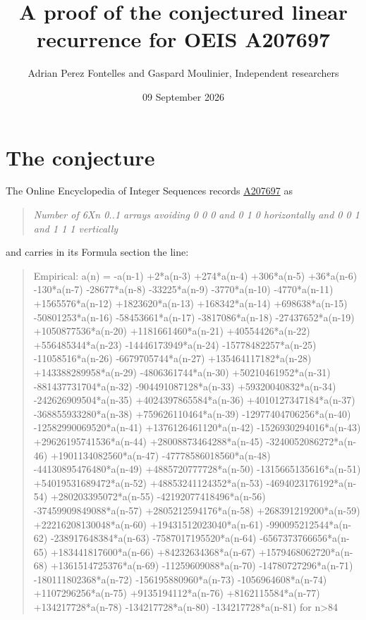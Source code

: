 \documentclass[11pt]{article}
\title{A proof of the conjectured linear recurrence for OEIS A207697}
\author{Adrian Perez Fontelles and Gaspard Moulinier, Independent researchers}
\date{09 September 2026}
\theoremstyle{definition}
\begin{document}
\maketitle
\section{The conjecture}

The Online Encyclopedia of Integer Sequences records \href{https://oeis.org/A207697}{A207697} as

\begin{quote}\itshape Number of 6Xn 0..1 arrays avoiding 0 0 0 and 0 1 0 horizontally and 0 0 1 and 1 1 1 vertically\end{quote}

and carries in its Formula section the line:

\begin{quote}\ttfamily Empirical: a(n) = -a(n-1) +2*a(n-3) +274*a(n-4) +306*a(n-5) +36*a(n-6) -130*a(n-7) -28677*a(n-8) -33225*a(n-9) -3770*a(n-10) -4770*a(n-11) +1565576*a(n-12) +1823620*a(n-13) +168342*a(n-14) +698638*a(n-15) -50801253*a(n-16) -58453661*a(n-17) -3817086*a(n-18) -27437652*a(n-19) +1050877536*a(n-20) +1181661460*a(n-21) +40554426*a(n-22) +556485344*a(n-23) -14446173949*a(n-24) -15778482257*a(n-25) -11058516*a(n-26) -6679705744*a(n-27) +135464117182*a(n-28) +143388289958*a(n-29) -4806361744*a(n-30) +50210461952*a(n-31) -881437731704*a(n-32) -904491087128*a(n-33) +59320040832*a(n-34) -242626909504*a(n-35) +4024397865584*a(n-36) +4010127347184*a(n-37) -368855933280*a(n-38) +759626110464*a(n-39) -12977404706256*a(n-40) -12582990069520*a(n-41) +1376126461120*a(n-42) -1526930294016*a(n-43) +29626195741536*a(n-44) +28008873464288*a(n-45) -3240052086272*a(n-46) +1901134082560*a(n-47) -47778586018560*a(n-48) -44130895476480*a(n-49) +4885720777728*a(n-50) -1315665135616*a(n-51) +54019531689472*a(n-52) +48853241124352*a(n-53) -4694023176192*a(n-54) +280203395072*a(n-55) -42192077418496*a(n-56) -37459909849088*a(n-57) +2805212594176*a(n-58) +268391219200*a(n-59) +22216208130048*a(n-60) +19431512023040*a(n-61) -990095212544*a(n-62) -238917648384*a(n-63) -7587017195520*a(n-64) -6567373766656*a(n-65) +183441817600*a(n-66) +84232634368*a(n-67) +1579468062720*a(n-68) +1361514725376*a(n-69) -11259609088*a(n-70) -14780727296*a(n-71) -180111802368*a(n-72) -156195880960*a(n-73) -1056964608*a(n-74) +1107296256*a(n-75) +9135194112*a(n-76) +8162115584*a(n-77) +134217728*a(n-78) -134217728*a(n-80) -134217728*a(n-81) for n>84\end{quote}
\end{document}

